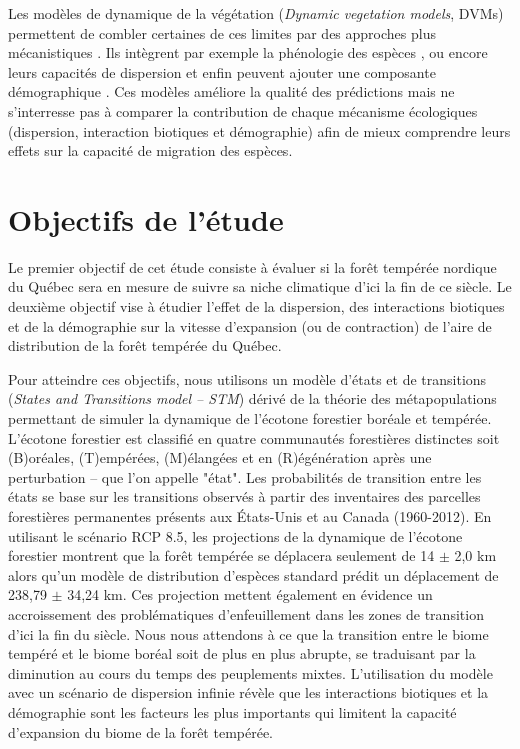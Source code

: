 Les modèles de dynamique de la végétation
(\textit{Dynamic vegetation models}, DVMs) permettent de combler certaines de ces limites par des
approches plus mécanistiques \citep{Snell2014a}. Ils intègrent par exemple la phénologie des espèces
\citep{Letters2001,Morin2008}, ou encore leurs capacités de dispersion \citep{Nobis2014,Iverson2004}
et enfin peuvent ajouter une composante démographique \citep{Lischke2006a,Vanderwel2014}. Ces
modèles améliore la qualité des prédictions mais ne s'interresse pas à comparer la
contribution de chaque mécanisme écologiques (dispersion, interaction biotiques et démographie) afin
de mieux comprendre leurs effets sur la capacité de migration des espèces. 

\section*{Objectifs de l'étude}

Le premier objectif de cet étude consiste à évaluer si la forêt tempérée nordique du Québec sera en
mesure de suivre sa niche climatique d'ici la fin de ce siècle. Le deuxième objectif vise à étudier
l'effet de la dispersion, des interactions biotiques et de la démographie sur la vitesse d'expansion
(ou de contraction) de l'aire de distribution de la forêt tempérée du Québec. 

Pour atteindre ces
objectifs, nous utilisons un modèle d'états et de transitions (\textit{States and Transitions model --
STM}) dérivé de la théorie des métapopulations permettant de simuler la dynamique de l'écotone
forestier boréale et tempérée. L'écotone forestier est classifié en quatre communautés forestières
distinctes soit (B)oréales, (T)empérées, (M)élangées et en (R)égénération après une perturbation --
que l'on appelle "état". Les probabilités de transition entre les états se base sur les transitions
observés à partir des inventaires des parcelles forestières permanentes présents aux États-Unis et
au Canada (1960-2012). En utilisant le scénario RCP 8.5, les projections de la dynamique de
l'écotone forestier montrent que la forêt tempérée se déplacera seulement de 14 $\pm$ 2,0 km alors
qu'un modèle de distribution d'espèces standard prédit un déplacement de 238,79 $\pm$ 34,24 km. Ces
projection mettent également en évidence un accroissement des problématiques d’enfeuillement dans
les zones de transition d’ici la fin du siècle. Nous nous attendons à ce que la transition entre le
biome tempéré et le biome boréal soit de plus en plus abrupte, se traduisant par la diminution au
cours du temps des peuplements mixtes. L'utilisation du modèle avec un scénario de dispersion
infinie révèle que les interactions biotiques et la démographie sont les facteurs les plus
importants qui limitent la capacité d'expansion du biome de la forêt tempérée.


